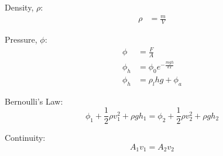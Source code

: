 \documentclass[10pt, letterpaper]{book}
\begin{document}
\begin{multicols*}{2}
        Density, $\rho$:
        \begin{align}
            \rho    & = \frac{m}{V}                             
        \end{align}

        Pressure, $\phi$:
        \begin{align}
            \phi    & = \frac{F}{A}                             \\
            \phi_{h}& = \phi_{0}e^{-\frac{mgh}{kT}}             \\
            \phi_{h}& = \rho_{l}hg + \phi_{a}
        \end{align}

        Bernoulli's Law:
        \begin{equation}
            \phi_{1} + \frac{1}{2}\rho v_{1}^{2} + \rho gh_{1} = 
            \phi_{2} + \frac{1}{2}\rho v_{2}^{2} + \rho gh_{2}
        \end{equation}

        Continuity:
        \begin{equation}
            A_{1}v_{1} = A_{2}v_{2}
        \end{equation}

    \end{multicols*}

    \pagebreak
\end{document}
